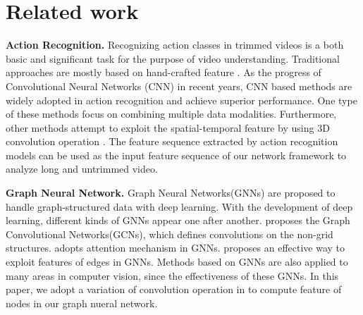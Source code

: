 \documentclass[runningheads]{llncs}
\begin{document}
\section{Related work}

\noindent\textbf{Action Recognition.}
Recognizing action classes in trimmed videos is a both basic and significant task for the purpose of video understanding. Traditional approaches are mostly based on hand-crafted feature \cite{one,two,three,four}. As the progress of Convolutional Neural Networks (CNN) in recent years, CNN based methods are widely adopted in action recognition and achieve superior performance. One type of these methods \cite{five,six} focus on combining multiple data modalities. Furthermore, other methods attempt to exploit the spatial-temporal feature by using 3D convolution operation \cite{eight,nine,ten}. The feature sequence extracted by action recognition models can be used as the input feature sequence of our network framework to analyze long and untrimmed video.

\noindent\textbf{Graph Neural Network.} Graph Neural Networks(GNNs) are proposed to handle graph-structured data with deep learning. With the development of deep learning, different kinds of GNNs appear one after another. \cite{Kipf_GCN} proposes the Graph Convolutional Networks(GCNs), which defines convolutions on the non-grid structures. \cite{GAT} adopts attention mechanism in GNNs. \cite{EGGN} proposes an effective way to exploit features of edges in GNNs.  Methods\cite{visual_GNNs_1,visual_GNNs_2,visual_GNNs_3} based on GNNs are also applied to many areas in computer vision, since the effectiveness of these GNNs. In this paper, we adopt a variation of convolution operation in \cite{EGGN} to compute feature of nodes in our graph nueral network.
\end{document}
